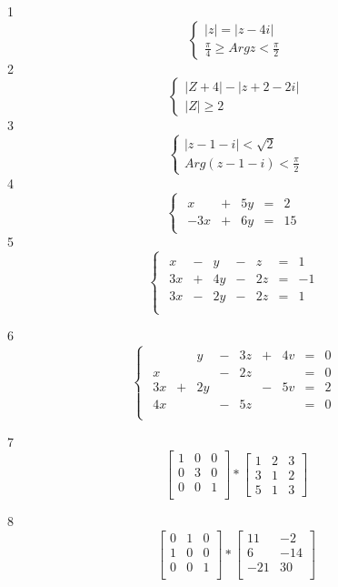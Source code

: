 \documentclass[a4paper]{article}
\begin{document}
1
$$
\begin {cases}
|z|=|z-4i| \\
\frac{\pi}{4} \geq Arg z < \frac{\pi}{2}
\end {cases}
$$
2
$$
\begin{cases}
|Z+4| - |z+2-2i| \\
|Z| \geq 2
\end{cases}
$$
3
$$
\begin{cases}
|z-1-i| < \sqrt{2} \\
Arg(z-1-i)< \frac{\pi}{2}
\end{cases}
$$
4
$$
\begin{cases}
\begin{array}{rrrrr}
x & + &  5y & = & 2  \\
-3x & + & 6y & = & 15 
\end{array}
\end {cases}
$$
5
$$
\begin{cases}
\begin{array}{rcrcrcr}
 x&-&y&-&z&=&1 \\
 3x&+&4y&-&2z&=&-1 \\
 3x&-&2y&-&2z&=&1 \\

\end{array}
\end{cases}
$$

6
$$
\begin{cases}
\begin{array}{rcrcrcrcr}
 &  & y & - & 3z & + & 4v & = & 0\\
 x & &  & - & 2z & &  & = & 0 \\
 3x & + & 2y & & & - & 5v & = & 2 \\
 4x & & & - & 5z & & & = & 0\\
\end{array}
\end{cases}
$$


7
$$
\left[ \begin{array}{ccc}
1 & 0 & 0 \\
0 & 3 & 0 \\
0 & 0 & 1 \\
\end{array} \right] 
*
\left[ \begin{array} {ccc}
1&2&3\\
3&1&2\\
5&1&3
\end{array} \right]
$$

8 
$$
\left[ \begin{array}{ccc}
0 & 1 & 0 \\
1 & 0 & 0 \\
0 & 0 & 1 \\
\end{array}\right] 
*
\left[ \begin{array}{cc}
11 & -2 \\
6 & -14\\
-21 & 30 \\
\end{array} \right]
$$
\end{document}

